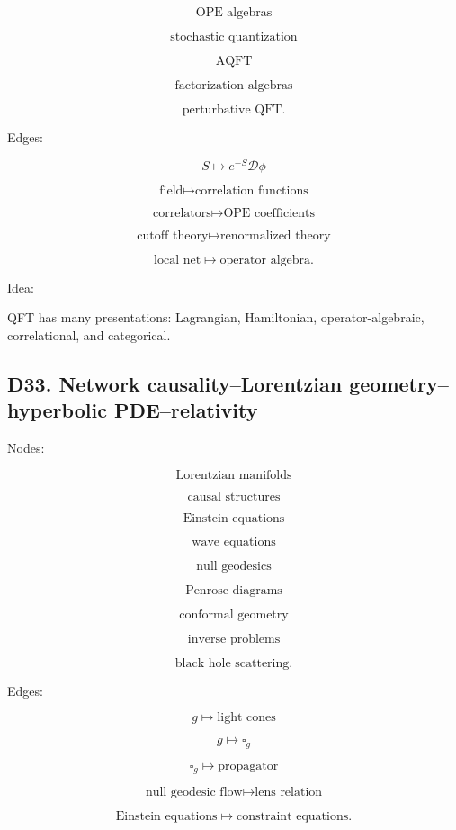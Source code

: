\documentclass[11pt]{article}
\begin{document}
\[
\text{OPE algebras}
\]

\[
\text{stochastic quantization}
\]

\[
\text{AQFT}
\]

\[
\text{factorization algebras}
\]

\[
\text{perturbative QFT}.
\]

Edges:

\[
S\mapsto e^{-S}\mathcal D\phi
\]

\[
\text{field}\mapsto \text{correlation functions}
\]

\[
\text{correlators}\mapsto \text{OPE coefficients}
\]

\[
\text{cutoff theory}\mapsto \text{renormalized theory}
\]

\[
\text{local net}\mapsto \text{operator algebra}.
\]

Idea:

QFT has many presentations: Lagrangian, Hamiltonian, operator-algebraic, correlational, and categorical.



\subsection{D33. Network causality--Lorentzian geometry--hyperbolic PDE--relativity}

Nodes:

\[
\text{Lorentzian manifolds}
\]

\[
\text{causal structures}
\]

\[
\text{Einstein equations}
\]

\[
\text{wave equations}
\]

\[
\text{null geodesics}
\]

\[
\text{Penrose diagrams}
\]

\[
\text{conformal geometry}
\]

\[
\text{inverse problems}
\]

\[
\text{black hole scattering}.
\]

Edges:

\[
g\mapsto \text{light cones}
\]

\[
g\mapsto \square_g
\]

\[
\square_g\mapsto \text{propagator}
\]

\[
\text{null geodesic flow}\mapsto \text{lens relation}
\]

\[
\text{Einstein equations}\mapsto \text{constraint equations}.
\]
\end{document}
